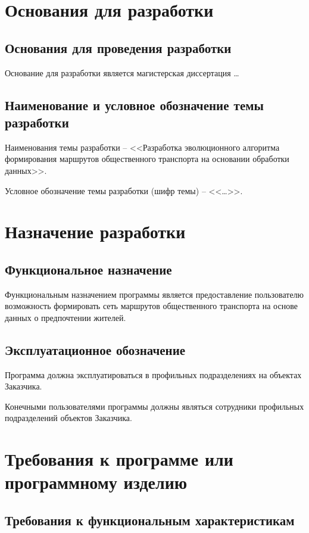 \chapter{Основания для разработки}
\section{Основания для проведения разработки}
Основание для разработки является магистерская диссертация \ldots

\section{Наименование и условное обозначение темы разработки}
Наименования темы разработки -- <<Разработка эволюционного алгоритма формирования маршрутов общественного 
транспорта на основании обработки данных>>.

Условное обозначение темы разработки (шифр темы) -- <<\ldots>>.

\chapter{Назначение разработки}
\section{Функциональное назначение}
Функциональным назначением программы является предоставление пользователю возможность формировать сеть 
маршрутов общественного транспорта на основе данных о предпочтении жителей.

\section{Эксплуатационное обозначение}
Программа должна эксплуатироваться в профильных подразделениях на объектах Заказчика.

Конечными пользователями программы должны являться сотрудники профильных подразделений объектов Заказчика.

\chapter{Требования к программе или программному изделию}
\section{Требования к функциональным характеристикам}
% 
%

